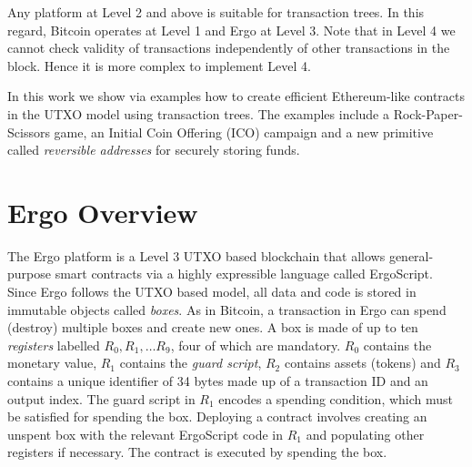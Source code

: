 \documentclass[runningheads]{llncs}
\newcommand{\langname}{ErgoScript\xspace}
\begin{document}

Any platform at Level 2 and above is suitable for transaction trees. In this regard, Bitcoin operates at Level 1 and Ergo at Level 3. Note that in Level 4 we cannot check validity of transactions independently of other transactions in the block. Hence it is more complex to implement Level 4. 




In this work we show via examples how to create efficient Ethereum-like contracts in the UTXO model using transaction trees. 
The examples include a Rock-Paper-Scissors game, an Initial Coin Offering (ICO) campaign and a new primitive called {\em reversible addresses} for securely storing funds. 


\section{Ergo Overview}
\label{ergo-overview}

The Ergo platform is a Level 3 UTXO based blockchain that allows general-purpose smart contracts via a highly expressible language called \langname. 
Since Ergo follows the UTXO based model, all data and code is stored in immutable objects called {\em boxes}. As in Bitcoin, a transaction in Ergo can spend (destroy) multiple boxes and create new ones. 
A box is made of up to ten {\em registers} labelled $R_0, R_1,\ldots R_9$, four of which are mandatory. $R_0$ contains the monetary value, $R_1$ contains the {\em guard script}, $R_2$ contains assets (tokens) and $R_3$ contains a unique identifier of 34 bytes made up of a transaction ID and an output index. The guard script in $R_1$ encodes a spending condition, which must be satisfied for spending the box. Deploying a contract involves creating an unspent box with the relevant \langname code in $R_1$ and populating other registers if necessary. The contract is executed by spending the box. 
\end{document}
